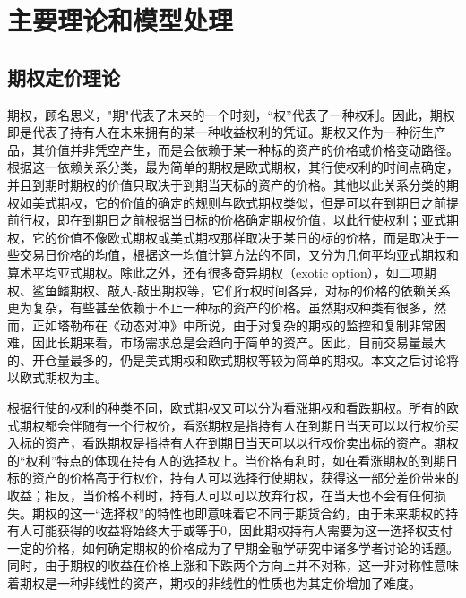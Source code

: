 
\chapter{主要理论和模型处理}
\label{chap:bib}

\section{期权定价理论}

期权，顾名思义，"期"代表了未来的一个时刻，“权”代表了一种权利。因此，期权即是代表了持有人在未来拥有的某一种收益权利的凭证。期权又作为一种衍生产品，其价值并非凭空产生，而是会依赖于某一种标的资产的价格或价格变动路径。根据这一依赖关系分类，最为简单的期权是欧式期权，其行使权利的时间点确定，并且到期时期权的价值只取决于到期当天标的资产的价格。其他以此关系分类的期权如美式期权，它的价值的确定的规则与欧式期权类似，但是可以在到期日之前提前行权，即在到期日之前根据当日标的价格确定期权价值，以此行使权利；亚式期权，它的价值不像欧式期权或美式期权那样取决于某日的标的价格，而是取决于一些交易日价格的均值，根据这一均值计算方法的不同，又分为几何平均亚式期权和算术平均亚式期权。除此之外，还有很多奇异期权（exotic option），如二项期权、鲨鱼鳍期权、敲入-敲出期权等，它们行权时间各异，对标的价格的依赖关系更为复杂，有些甚至依赖于不止一种标的资产的价格。虽然期权种类有很多，然而，正如塔勒布在《动态对冲》中所说，由于对复杂的期权的监控和复制非常困难，因此长期来看，市场需求总是会趋向于简单的资产。因此，目前交易量最大的、开仓量最多的，仍是美式期权和欧式期权等较为简单的期权。本文之后讨论将以欧式期权为主。

根据行使的权利的种类不同，欧式期权又可以分为看涨期权和看跌期权。所有的欧式期权都会伴随有一个行权价，看涨期权是指持有人在到期日当天可以以行权价买入标的资产，看跌期权是指持有人在到期日当天可以以行权价卖出标的资产。期权的“权利”特点的体现在持有人的选择权上。当价格有利时，如在看涨期权的到期日标的资产的价格高于行权价，持有人可以选择行使期权，获得这一部分差价带来的收益；相反，当价格不利时，持有人可以可以放弃行权，在当天也不会有任何损失。期权的这一“选择权”的特性也即意味着它不同于期货合约，由于未来期权的持有人可能获得的收益将始终大于或等于0，因此期权持有人需要为这一选择权支付一定的价格，如何确定期权的价格成为了早期金融学研究中诸多学者讨论的话题。同时，由于期权的收益在价格上涨和下跌两个方向上并不对称，这一非对称性意味着期权是一种非线性的资产，期权的非线性的性质也为其定价增加了难度。

